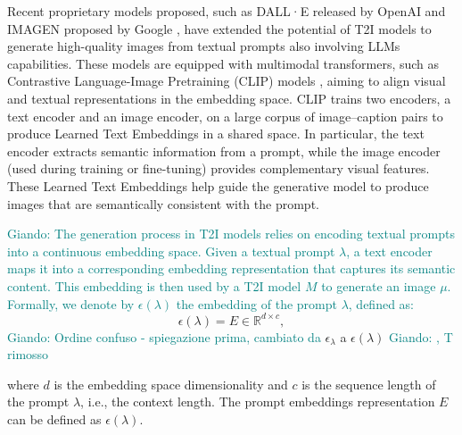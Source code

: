 \documentclass[acmsmall]{acmart}
\newcommand{\dalle}{DALL·E\xspace}
\newcommand{\imagen}{IMAGEN\xspace}
\newcommand{\giando}[1]{\textcolor{teal}{Giando: #1}}
\newcommand{\revthree}[1]{\textcolor{olive}{Revisore3: #1}}
\begin{document}
Recent proprietary models proposed, such as \dalle released by OpenAI  \cite{ramesh2022hierarchical} and \imagen proposed by Google \cite{ho2022imagen}, have extended the potential of T2I models to generate high-quality images from textual prompts also involving LLMs capabilities. These models are equipped with multimodal transformers, such as Contrastive Language-Image Pretraining (CLIP) models \cite{radford2021learning}, aiming to align visual and textual representations in the embedding space. CLIP trains two encoders, a text encoder and an image encoder, on a large corpus of image–caption pairs to produce Learned Text Embeddings in a shared space. In particular, the text encoder extracts semantic information from a prompt, while the image encoder (used during training or fine-tuning) provides complementary visual features. These Learned Text Embeddings help guide the generative model to produce images that are semantically consistent with the prompt. 

\giando{The generation process in T2I models relies on encoding textual prompts into a continuous embedding space. Given a textual prompt $\lambda$, a text encoder maps it into a corresponding embedding representation that captures its semantic content. This embedding is then used by a T2I model $M$ to generate an image $\mu$. Formally, we denote by $\epsilon(\lambda)$ the embedding of the prompt $\lambda$, defined as:}
\begin{equation}\label{eq:embeddinggeenral}
    \epsilon(\lambda) = E \in \mathbb{R}^{d \times c},
\end{equation}
\giando{Ordine confuso - spiegazione prima, cambiato da }$\epsilon_\lambda$ a $\epsilon(\lambda)$ \giando{, T rimosso}

where $d$ is the embedding space dimensionality and $c$ is the sequence length of the prompt $\lambda$, i.e., the context length. The prompt embeddings representation $E$ can be defined as $\epsilon(\lambda)$. 
\end{document}
